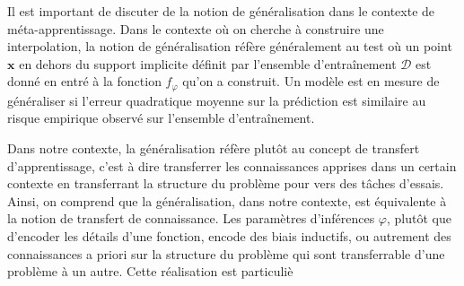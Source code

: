 

Il est important de discuter de la notion de généralisation dans le contexte de méta-apprentissage. Dans le contexte 
où on cherche à construire une interpolation, la notion de généralisation réfère généralement au test où un point $\mathbf{x}$ 
en dehors du support implicite définit par l'ensemble d'entraînement $\mathcal{D}$ est donné en entré à la fonction $f_{\varphi}$ 
qu'on a construit. Un modèle est en mesure de généraliser si l'erreur quadratique moyenne sur la prédiction est similaire 
au risque empirique observé sur l'ensemble d'entraînement. 

Dans notre contexte, la généralisation réfère plutôt au concept de transfert d'apprentissage, c'est à dire transferrer les connaissances 
apprises dans un certain contexte en transferrant la structure du problème pour vers des tâches d'essais. Ainsi, on comprend que la généralisation, 
dans notre contexte, est équivalente à la notion de transfert de connaissance. Les paramètres d'inférences $\varphi$, plutôt que d'encoder les détails 
d'une fonction, encode des biais inductifs, ou autrement des connaissances a priori sur la structure du problème qui sont transferrable d'une problème 
à un autre. Cette réalisation est particuliè

